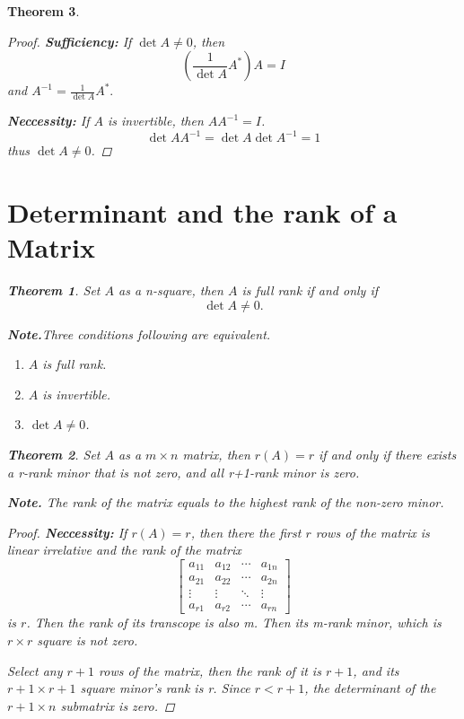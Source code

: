 \documentclass{article}
\newtheorem{theorem}{Theorem}[section]
\theoremstyle{definition}
\begin{document}
\begin{theorem}
\begin{proof}
    \textbf{Sufficiency:}
    If $\det A\neq 0$, then 
    $$(\frac{1}{\det A}A^{*})A=I$$
    and $A^{-1}=\frac{1}{\det A}A^{*}.$

    \textbf{Neccessity:}
    If $A$ is invertible, then $AA^{-1}=I$.
    $$\det AA^{-1}=\det{A} \det A^{-1}=1$$
    thus $\det A \neq 0$.
\end{proof}
 
\section{Determinant and the rank of a Matrix}
\begin{theorem}
    Set $A$ as a n-square, then $A$ is full rank if and only if
    $$\det A \neq 0.$$
\end{theorem}


\textbf{Note.}Three conditions following are equivalent.
\begin{enumerate}
    \item $A$ is full rank.
    \item $A$ is invertible.
    \item $\det A \neq 0$.
\end{enumerate}

\begin{theorem}
    Set $A$ as a $m\times n$ matrix, then $r(A)=r$ if
    and only if there exists a r-rank minor that is not zero,
    and all r+1-rank minor is zero.
\end{theorem}
\textbf{Note.} The rank of the matrix equals to the highest rank 
of the non-zero minor.

\begin{proof}




    \textbf{Neccessity:}
    If $r(A)=r$, then there the first $r$ rows of the matrix 
    is linear irrelative and the rank of the matrix
    $$\begin{bmatrix}
        a_{11}&a_{12} & \cdots & a_{1n}\\
        a_{21} & a_{22} & \cdots & a_{2n}\\
        \vdots & \vdots & \ddots & \vdots\\
        a_{r1} & a_{r2} & \cdots & a_{rn}
    \end{bmatrix}$$
    is $r$. Then the rank of its transcope is also m. Then its m-rank minor, 
    which is $r\times r$ square is not zero.

    Select any $r+1$ rows of the matrix, then the rank 
    of it is $r+1$, and its $r+1\times r+1$ square minor's rank 
    is r. Since $r<r+1$, the determinant of the $r+1\times n$ submatrix 
    is zero.


\end{proof}
\end{theorem}
\end{document}
